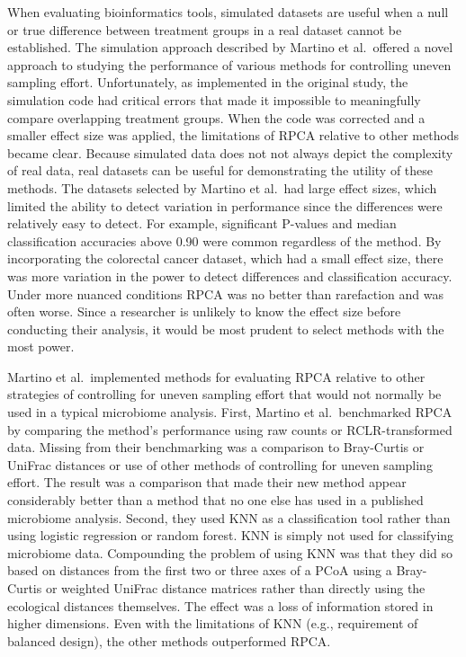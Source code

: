 \documentclass[
  11pt,
]{article}
\begin{document}
When evaluating bioinformatics tools, simulated datasets are useful when
a null or true difference between treatment groups in a real dataset
cannot be established. The simulation approach described by Martino et
al.~offered a novel approach to studying the performance of various
methods for controlling uneven sampling effort. Unfortunately, as
implemented in the original study, the simulation code had critical
errors that made it impossible to meaningfully compare overlapping
treatment groups. When the code was corrected and a smaller effect size
was applied, the limitations of RPCA relative to other methods became
clear. Because simulated data does not not always depict the complexity
of real data, real datasets can be useful for demonstrating the utility
of these methods. The datasets selected by Martino et al.~had large
effect sizes, which limited the ability to detect variation in
performance since the differences were relatively easy to detect. For
example, significant P-values and median classification accuracies above
0.90 were common regardless of the method. By incorporating the
colorectal cancer dataset, which had a small effect size, there was more
variation in the power to detect differences and classification
accuracy. Under more nuanced conditions RPCA was no better than
rarefaction and was often worse. Since a researcher is unlikely to know
the effect size before conducting their analysis, it would be most
prudent to select methods with the most power.

Martino et al.~implemented methods for evaluating RPCA relative to other
strategies of controlling for uneven sampling effort that would not
normally be used in a typical microbiome analysis. First, Martino et
al.~benchmarked RPCA by comparing the method's performance using raw
counts or RCLR-transformed data. Missing from their benchmarking was a
comparison to Bray-Curtis or UniFrac distances or use of other methods
of controlling for uneven sampling effort. The result was a comparison
that made their new method appear considerably better than a method that
no one else has used in a published microbiome analysis. Second, they
used KNN as a classification tool rather than using logistic regression
or random forest. KNN is simply not used for classifying microbiome
data. Compounding the problem of using KNN was that they did so based on
distances from the first two or three axes of a PCoA using a Bray-Curtis
or weighted UniFrac distance matrices rather than directly using the
ecological distances themselves. The effect was a loss of information
stored in higher dimensions. Even with the limitations of KNN (e.g.,
requirement of balanced design), the other methods outperformed RPCA.
\end{document}
